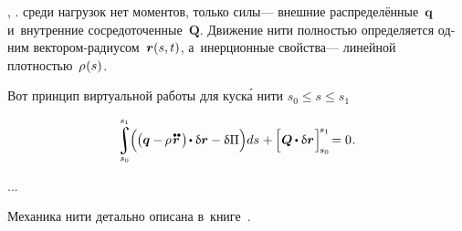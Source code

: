 \begin{otherlanguage}{russian}

 ,      .
 среди нагрузок нет моментов, только  силы\:--- внешние распределённые~$\bm{q}$ и~внутренние сосредоточенные~$\bm{Q}$.
Движение нити полностью определяется одним вектором-радиусом~${\bm{r}(s,t)}$, а~инерционные свойства\:--- линейной плотностью~${\rho\hspace{.1ex}(s)}$.

Вот принцип виртуальной работы для куск\'{а} нити ${s_0 \leq s \leq s_1}$

\nopagebreak\vspace{-0.2em}\begin{equation}
\scalebox{.95}{$
\displaystyle \integral\displaylimits_{\raisemath{.05em}{\mathclap{s_0}}}^{\raisemath{.15em}{\mathclap{s_1}}}
$}
\hspace{-0.25ex} \Bigl( \hspace{-0.1ex}
\bigl( \bm{q} - \hspace{-0.12ex} \rho \hspace{.2ex} \mathdotdotabove{\locationvector} \hspace{.36ex} \bigr)
\hspace{-0.25ex} \dotp \variation{\locationvector}
- \variation{\potential}
\Bigr) ds
\hspace{.1ex} + \hspace{-0.1ex} \Bigl[ \hspace{.1ex}
\bm{Q} \hspace{-0.1ex} \dotp \variation{\locationvector}
\hspace{.15ex} \Bigr]_{\hspace{-0.25ex}s_0}^{\hspace{-0.25ex}s_1}
\hspace{-0.33ex} = 0
\hspace{.1ex} .
\end{equation}

...

Механика нити детально описана в~книге~\cite{merkin-threadmechanics}.

\end{otherlanguage}

